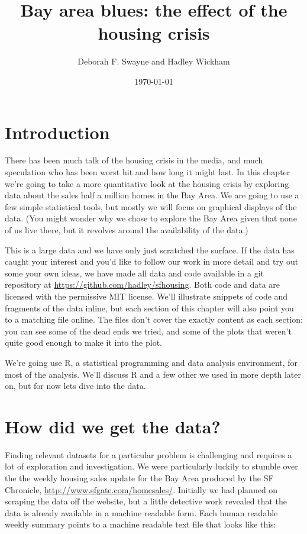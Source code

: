 \documentclass[oneside]{article}
\title{Bay area blues: the effect of the housing crisis}
\author{Deborah F. Swayne and Hadley Wickham}
\date{\today}
\begin{document}
\maketitle 

\section{Introduction}

There has been much talk of the housing crisis in the media, and much speculation who has been worst hit and how long it might last.  In this chapter we're going to take a more quantitative look at the housing crisis by exploring data about the sales half a million homes in the Bay Area.  We are going to use a few simple statistical tools, but mostly we will focus on graphical displays of the data.  (You might wonder why we chose to explore the Bay Area given that none of us live there, but it revolves around the availability of the data.)

This is a large data and we have only just scratched the surface.  If the data has caught your interest and you'd like to follow our work in more detail and try out some your own ideas, we have made all data and code available in a git repository at \url{https://github.com/hadley/sfhousing}. Both code and data are licensed with the permissive MIT license.  We'll illustrate snippets of code and fragments of the data inline, but each section of this chapter will also point you to a matching file online.  The files don't cover the exactly content as each section: you can see some of the dead ends we tried, and some of the plots that weren't quite good enough to make it into the plot.  

We're going use R, a statistical programming and data analysis environment, for most of the analysis.  We'll discuss R and a few other we used in more depth later on, but for now lets dive into the data.

\section{How did we get the data?}

Finding relevant datasets for a particular problem is challenging and requires a lot of exploration and investigation.  We were particularly luckily to stumble over the the weekly housing sales update for the Bay Area produced by the SF Chronicle, \url{http://www.sfgate.com/homesales/}.  Initially we had planned on scraping the data off the website, but a little detective work revealed that the data is already available in a machine readable form.  Each human readable weekly summary points to a machine readable text file that looks like this: 
\end{document}
